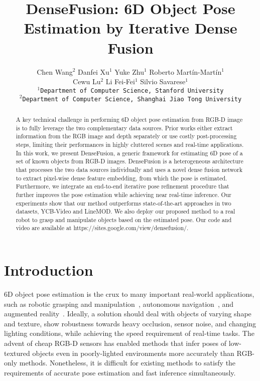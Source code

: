 \documentclass[10pt,twocolumn,letterpaper]{article}
\begin{document}
\title{DenseFusion: 6D Object Pose Estimation by Iterative Dense Fusion}

\author{Chen Wang$^{2}$ \qquad Danfei Xu$^{1}$ \qquad Yuke Zhu$^{1}$ \qquad Roberto Mart\'{i}n-Mart\'{i}n$^{1}$\\Cewu Lu$^{2}$ \qquad Li Fei-Fei$^{1}$ \qquad Silvio Savarese$^{1}$\\
{\tt\small $^{1}$Department of Computer Science, Stanford University}\\
{\tt\small $^{2}$Department of Computer Science, Shanghai Jiao Tong University}
}

\maketitle

\begin{abstract}
A key technical challenge in performing 6D object pose estimation from RGB-D image is to fully leverage the two complementary data sources. Prior works either extract information from the RGB image and depth separately or use costly post-processing steps, limiting their performances in highly cluttered scenes and real-time applications. In this work, we present DenseFusion, a generic framework for estimating 6D pose of a set of known objects from RGB-D images. DenseFusion is a heterogeneous architecture that processes the two data sources individually and uses a novel dense fusion network to extract pixel-wise dense feature embedding, from which the pose is estimated. Furthermore, we integrate an end-to-end iterative pose refinement procedure that further improves the pose estimation while achieving near real-time inference. Our experiments show that our method outperforms state-of-the-art approaches in two datasets, YCB-Video and LineMOD. We also deploy our proposed method to a real robot to grasp and manipulate objects based on the estimated pose. Our code and video are available at https://sites.google.com/view/densefusion/.
\end{abstract}

\section{Introduction}

6D object pose estimation is the crux to many important real-world applications, such as robotic grasping and manipulation~\cite{collet2011moped,zhu2014single,tremblay2018deep}, autonomous navigation~\cite{kitti,xu2017pointfusion,mv3d}, and augmented reality~\cite{tangle,marchand2016pose}. Ideally, a solution should deal with objects of varying shape and texture, show robustness towards heavy occlusion, sensor noise, and changing lighting conditions, while achieving the speed requirement of real-time tasks. The advent of cheap RGB-D sensors has enabled methods that infer poses of low-textured objects even in poorly-lighted environments more accurately than RGB-only methods. Nonetheless, it is difficult for existing methods to satisfy the requirements of accurate pose estimation and fast inference simultaneously.
\end{document}
